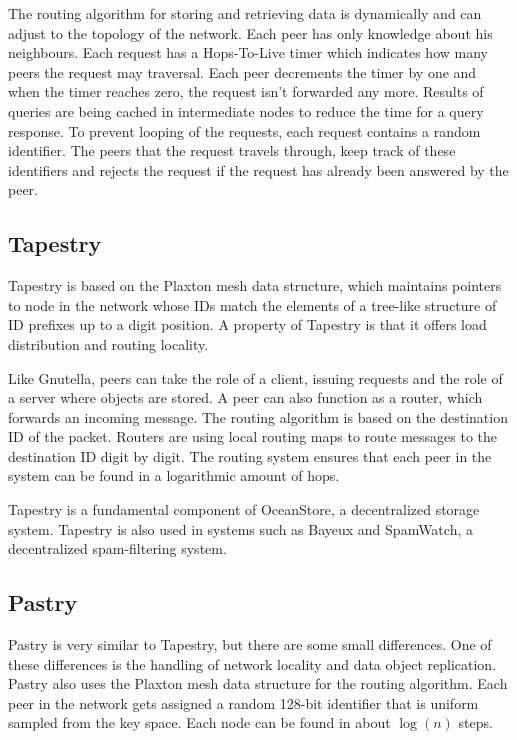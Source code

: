 \documentclass{article}
\begin{document}
		The routing algorithm for storing and retrieving data is dynamically and can adjust to the topology of the network. Each peer has only knowledge about his neighbours. Each request has a Hops-To-Live timer which indicates how many peers the request may traversal. Each peer decrements the timer by one and when the timer reaches zero, the request isn't forwarded any more. Results of queries are being cached in intermediate nodes to reduce the time for a query response. To prevent looping of the requests, each request contains a random identifier. The peers that the request travels through, keep track of these identifiers and rejects the request if the request has already been answered by the peer.
		
	\subsection{Tapestry} %
		Tapestry is based on the Plaxton mesh data structure, which maintains pointers to node in the network whose IDs match the elements of a tree-like structure of ID prefixes up to a digit position. A property of Tapestry is that it offers load distribution and routing locality.
		
		Like Gnutella, peers can take the role of a client, issuing requests and the role of a server where objects are stored. A peer can also function as a router, which forwards an incoming message. The routing algorithm is based on the destination ID of the packet. Routers are using local routing maps to route messages to the destination ID digit by digit. The routing system ensures that each peer in the system can be found in a logarithmic amount of hops.
		
		Tapestry is a fundamental component of OceanStore, a decentralized storage system. Tapestry is also used in systems such as Bayeux and SpamWatch, a decentralized spam-filtering system.

	\subsection{Pastry} %
		Pastry is very similar to Tapestry, but there are some small differences. One of these differences is the handling of network locality and data object replication. Pastry also uses the Plaxton mesh data structure for the routing algorithm. Each peer in the network gets assigned a random 128-bit identifier that is uniform sampled from the key space. Each node can be found in about $\log(n)$ steps.
\end{document}
